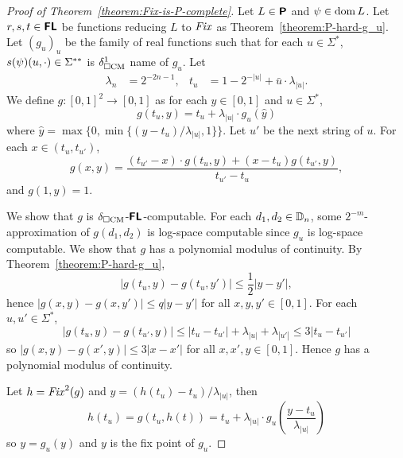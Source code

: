 \documentclass[envcountsame,orivec,oribibl]{llncs}
\begin{document}
\begin{proof}
[Proof of Theorem~\ref{theorem:Fix-is-P-complete}]
Let $L \in \text{\bfseries \sffamily \upshape P}$ and $\psi \in \mathop{\rm dom} L$.
Let $r, s, t \in \text{\bfseries \sffamily \upshape FL}$ be functions reducing $L$ to $\mathit{Fix}$
as Theorem~\ref{theorem:P-hard-g_u}.
Let $(g_u)_u$ be the family of real functions such that for each $u \in \Sigma^*$, 
$s(\psi)(u, \cdot) \in \Sigma ^{**}$ is $\delta _{\square \mathrm{CM}}^1$ name of $g_u$.
Let
\begin{align}
 \lambda_n &= 2^{-2n-1},
 &
 t_u & = 1 - 2^{-|u|} + \bar u \cdot \lambda_{|u|}.
\end{align}
We define $g \colon [0,1]^2 \to [0,1]$ as
for each $y \in [0,1]$ and $u \in \Sigma^*$,
\begin{equation}
 g(t_u, y) = t_u + \lambda_{|u|} \cdot g_u(\hat y)
\end{equation}
where $\hat y = \max\{0, \min\{(y-t_u)/\lambda_{|u|}, 1\}\}$.
Let $u'$ be the next string of $u$.
For each $x \in (t_u, t_{u'})$,
\begin{equation}
 g(x, y) 
  = \frac{(t_{u'} - x) \cdot g(t_u, y) + (x - t_u)g(t_{u'}, y)}{t_{u'} - t_u},
\end{equation}
and $g(1, y) = 1$.

We show that $g$ is $\delta _{\square \mathrm{CM}}$-$\text{\bfseries \sffamily \upshape FL}$-computable.
For each $d_1, d_2 \in \mathbb D_n$, some $2^{-m}$-approximation of $g(d_1, d_2)$ 
is log-space computable since $g_u$ is log-space computable.
We show that $g$ has a polynomial modulus of continuity.
By Theorem~\ref{theorem:P-hard-g_u}, 
\begin{equation}
 |g(t_u, y) - g(t_u, y')| \le \frac 1 2 |y - y'|,
\end{equation}
hence $|g(x, y) - g(x, y')| \le q|y - y'|$ for all $x, y, y' \in [0,1]$.
For each $u, u' \in \Sigma^*$,
\begin{equation}
 |g(t_u, y) - g(t_{u'}, y)| \le |t_u - t_{u'}| + \lambda_{|u|} + \lambda_{|u'|} \le 3|t_u - t_{u'}|
\end{equation}
so $|g(x, y) - g(x', y)| \le 3|x-x'|$ for all $x, x', y \in [0,1]$.
Hence $g$ has a polynomial modulus of continuity.


Let $h = \mathit{Fix}^2(g)$ and $y = (h(t_u)-t_u)/\lambda_{|u|}$, then
\begin{equation}
 h(t_u) = g(t_u, h(t)) = t_u + \lambda_{|u|} \cdot g_u \left( \frac{y-t_u}{\lambda_{|u|}} \right)
\end{equation}
so $y = g_u(y)$ and $y$ is the fix point of $g_u$.
\end{proof}
\end{document}
